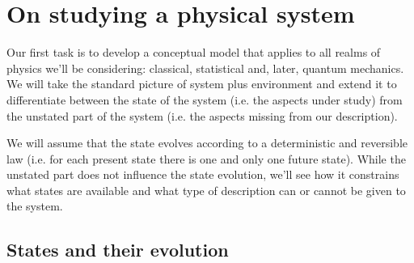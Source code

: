 \documentclass[smallextended]{svjour3}
\numberwithin{equation}{section}
\theoremstyle{definition}
\begin{document}
\section{On studying a physical system}
\label{sec:fundamental_model}


Our first task is to develop a conceptual model that applies to all realms of physics we'll be considering: classical, statistical and, later, quantum mechanics. We will take the standard picture of system plus environment and extend it to differentiate between the state of the system (i.e. the aspects under study) from the unstated part of the system (i.e. the aspects missing from our description).

We will assume that the state evolves according to a deterministic and reversible law (i.e. for each present state there is one and only one future state). While the unstated part does not influence the state evolution, we'll see how it constrains what states are available and what type of description can or cannot be given to the system.

\subsection{States and their evolution}
\end{document}

